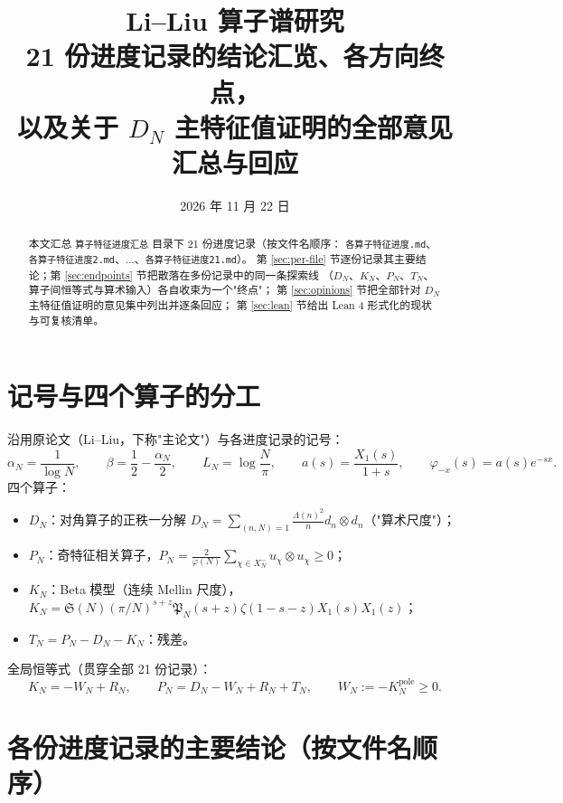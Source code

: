 \documentclass[11pt,a4paper]{ctexart}
\title{\bfseries Li--Liu 算子谱研究\\[2pt]
\large 21 份进度记录的结论汇览、各方向终点，\\[2pt]
以及关于 $D_N$ 主特征值证明的全部意见汇总与回应}
\author{}
\date{2026 年 11 月 22 日}
\newcommand{\pole}{\mathrm{pole}}
\newcommand{\al}{\alpha_{N}}
\newcommand{\be}{\beta}
\newcommand{\LN}{L_{N}}
\begin{document}
\maketitle

\begin{abstract}
\noindent
本文汇总 \texttt{算子特征进度汇总} 目录下 21 份进度记录（按文件名顺序：
\texttt{各算子特征进度.md}、\texttt{各算子特征进度2.md}、$\ldots$、\texttt{各算子特征进度21.md}）。
第 \ref{sec:per-file} 节逐份记录其主要结论；第 \ref{sec:endpoints} 节把散落在多份记录中的同一条探索线
（$D_N$、$K_N$、$P_N$、$T_N$、算子间恒等式与算术输入）各自收束为一个"终点"；
第 \ref{sec:opinions} 节把全部针对 $D_N$ 主特征值证明的意见集中列出并逐条回应；
第 \ref{sec:lean} 节给出 Lean 4 形式化的现状与可复核清单。
\end{abstract}

\tableofcontents
\bigskip

\section{记号与四个算子的分工}\label{sec:setup}

沿用原论文（Li--Liu，下称"主论文"）与各进度记录的记号：
\[
\al=\frac{1}{\log N},\qquad \be=\frac{1}{2}-\frac{\al}{2},\qquad
\LN=\log\frac{N}{\pi},\qquad
a(s)=\frac{X_1(s)}{1+s},\qquad \varphi_{-x}(s)=a(s)e^{-sx}.
\]
四个算子：
\begin{itemize}
\item $D_N$：对角算子的正秩一分解 $D_N=\sum_{(n,N)=1}\frac{\Lambda(n)^2}{n}d_n\otimes d_n$（"算术尺度"）；
\item $P_N$：奇特征相关算子，$P_N=\frac{2}{\varphi(N)}\sum_{\chi\in X_N^-}u_\chi\otimes u_\chi\ge0$；
\item $K_N$：Beta 模型（连续 Mellin 尺度），$K_N=\mathfrak S(N)(\pi/N)^{s+z}\mathfrak P_N(s+z)\zeta(1-s-z)X_1(s)X_1(z)$；
\item $T_N=P_N-D_N-K_N$：残差。
\end{itemize}
全局恒等式（贯穿全部 21 份记录）：
\begin{equation}\label{eq:main-split}
\boxed{\;K_N=-W_N+R_N,\qquad P_N=D_N-W_N+R_N+T_N,\qquad W_N:=-K_N^{\pole}\ge0.\;}
\end{equation}

\section{各份进度记录的主要结论（按文件名顺序）}\label{sec:per-file}
\end{document}
